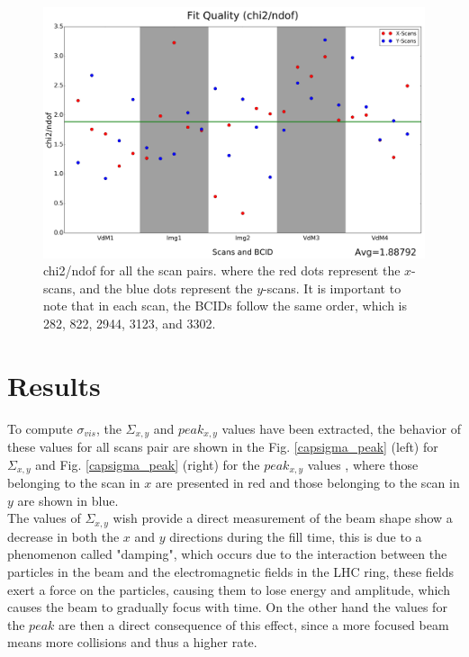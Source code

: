 \begin{center}
  \begin{figure}[h!]
    \centering
    \includegraphics[scale=.025]{Chapter4/DGConst_chi2.png}
    \caption[chi2/ndof for all scan pairs]{ chi2/ndof for all the scan pairs.  where the red dots represent the $x$-scans, and the blue dots represent the $y$-scans. It is important to note that in each scan, the BCIDs follow the same order, which is 282, 822, 2944, 3123, and 3302.} 
    \label{chi2/ndof}
  \end{figure}
\end{center}

\section{Results}

To compute $\sigma_{vis}$, the $\Sigma_{x,y}$ and $peak_{x,y}$ values have been extracted, the behavior of these values ​​for all scans pair are shown in the  Fig. \ref{capsigma_peak} (left) for $\Sigma_{x,y}$ and Fig. \ref{capsigma_peak} (right) for the $peak_{x,y}$ values , where those belonging to the scan in $x$ are presented in red and those belonging to the scan in $y$ are shown in blue.\\

The values of $\Sigma_{x,y}$ wish provide a direct measurement of the beam shape show a decrease in both the $x$ and $y$ directions during the fill time, this is due to a phenomenon called "damping", which occurs due to the interaction between the particles in the beam and the electromagnetic fields in the LHC ring, these fields exert a force on the particles, causing them to lose energy and amplitude, which causes the beam to gradually focus with time. On the other hand the values ​​for the $peak$ are then a direct consequence of this effect, since a more focused beam means more collisions and thus a higher rate.\\

